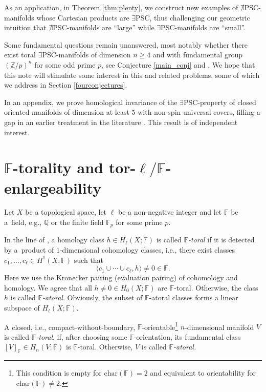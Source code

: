 \documentclass[10pt,a4paper]{amsart}
\numberwithin{equation}{section}
\newcommand{\F}{\mathbb{F}}
\newcommand{\Z}{\mathbb{Z}}
\newcommand{\charac}{\mathrm{char}}
\newcommand{\no}{{\color{brown!70!black}$\nexists$}{\sf PSC}}
\newcommand{\yes}{{\color {blue!70!black}$\exists$}{\sf PSC}}
\begin{document}
As an application, in Theorem \ref{thm:plenty}, we construct new examples of \no-manifolds whose Cartesian products are \yes, thus challenging our geometric intuition that \no-manifolds are ``large'' while \yes-manifolds are ``small''.


Some fundamental questions remain unanswered, most notably whether there exist toral \yes-manifolds of dimension $n \geq 4$ and with fundamental group $(\Z/p)^n$ for some odd prime $p$, see Conjecture \ref{main_conj} and \cite[Problem 9]{MP2021}.
We hope that this note will stimulate some interest in this and related problems, some of which we address in Section \ref{fourconjectures}.

In an appendix, we prove homological invariance of the \yes-property of closed oriented manifolds of dimension at least $5$ with non-spin universal covers, filling a gap in an earlier treatment in the literature \cite{RS}.
This result is of independent interest.

\section[Torality and tor-enlargeability]{$\boldsymbol{\F}$-torality and tor-$\boldsymbol{\ell/\F}$-enlargeability}

\begin{Definition} \label{deftoral}
Let $X$ be a topological space, let $\ell$ be a non-negative integer and let $\mathbb{F}$ be a~field, e.g., $\mathbb{Q}$ or the finite field $\mathbb F_{p}$ for some prime $p$.

In the line of \cite{Han20,Jo2004}, a homology class $h \in H_\ell(X; \F)$ is called {\it $\mathbb F$-toral} if it is detected by a~product of $1$-dimensional cohomology classes, i.e., there exist classes $c_1, \ldots, c_\ell \in H^1(X ; \mathbb F)$ such that
\[
 \langle c_1\cup \cdots \cup c_\ell, h \rangle \neq 0 \in \F.
\]
Here we use the Kronecker pairing (evaluation pairing) of cohomology and homology.
We agree that all $h \neq 0 \in H_0(X; \F)$ are $\F$-toral.
Otherwise, the class $h$ is called {\it $\F$-atoral}.
Obviously, the subset of $\F$-atoral classes forms a linear subspace of $H_{\ell}(X; \F)$.

A closed, i.e., compact-without-boundary, $\F$-orientable\footnote{This condition is empty for $\charac(\F) = 2$ and equivalent to orientability for $\charac(\F) \neq 2$.} $n$-dimensional manifold $V$ is called {\it $\F$-toral}, if, after choosing some $\F$-orientation, its fundamental class $[V]_{\F} \in H_{n}(V; \F)$ is $\F$-toral.
Otherwise, $V$ is called {\it $\F$-atoral.}
\end{Definition}
\end{document}
